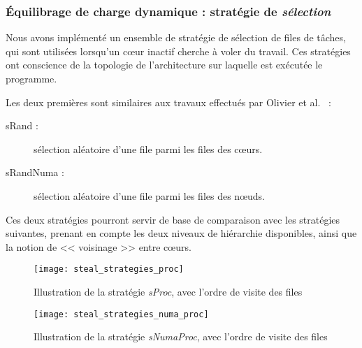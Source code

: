 \subsubsection{Équilibrage de charge dynamique : stratégie de \emph{sélection}}
\label{sec:openmp:runtime:select}


Nous avons implémenté un ensemble de stratégie de sélection de files de tâches, qui sont utilisées lorsqu'un cœur inactif cherche à voler du travail. Ces stratégies ont conscience de la topologie de l'architecture sur laquelle est exécutée le programme.

Les deux premières sont similaires aux travaux effectués par Olivier et al.~\cite{Olivier2012} :
\begin{description}
  \item [sRand :] sélection aléatoire d'une file parmi les files des cœurs.
  \item [sRandNuma :] sélection aléatoire d'une file parmi les files des nœuds.
\end{description}

Ces deux stratégies pourront servir de base de comparaison avec les stratégies suivantes, prenant en compte les deux niveaux de hiérarchie disponibles, ainsi que la notion de << voisinage >> entre cœurs.

\begin{figure}[t!]
  \centering
  \texttt{[image: steal\_strategies\_proc]}
  \caption{Illustration de la stratégie \emph{sProc}, avec l'ordre de visite des files}\label{fig:openmp:runtime:steal_proc}
\end{figure}

\begin{figure}[h!]
  \centering
  \texttt{[image: steal\_strategies\_numa\_proc]}
  \caption{Illustration de la stratégie \emph{sNumaProc}, avec l'ordre de visite des files}\label{fig:openmp:runtime:steal_numa_proc}
\end{figure}

